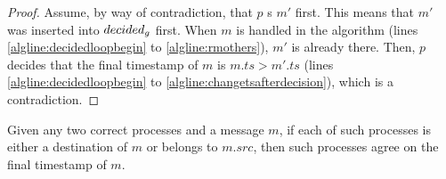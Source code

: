 \documentclass[times, 10pt]{article}
\begin{document}
\begin{proof}
Assume, by way of contradiction, that $p$ \rmcast{}s $m'$ first. This means that $m'$ was inserted into $decided\text{$_g$}$ first. When $m$ is handled in the algorithm (lines \ref{algline:decidedloopbegin} to \ref{algline:rmothers}), $m'$ is already there. Then, $p$ decides that the final timestamp of $m$ is $m.ts > m'.ts$ (lines \ref{algline:decidedloopbegin} to \ref{algline:changetsafterdecision}), which is a contradiction.
\end{proof}





\begin{lems} \label{lemma:agreetimestamps}
Given any two correct processes and a message $m$, if each of such processes is either a destination of $m$ or belongs to $m.src$, then such processes agree on the final timestamp of $m$.
\end{lems}
\end{document}
